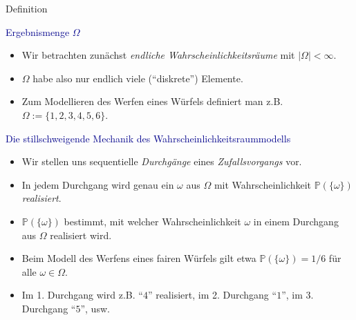 \documentclass[
  8pt,
  ignorenonframetext,
]{beamer}
\providecommand{\tightlist}{%
  \setlength{\itemsep}{0pt}\setlength{\parskip}{0pt}}
\begin{document}
\begin{frame}{Definition}
\protect\hypertarget{definition-3}{}

\textcolor{darkblue}{Ergebnismenge $\Omega$} \small

\begin{itemize}
\tightlist
\item
  Wir betrachten zunächst \emph{endliche Wahrscheinlichkeitsräume} mit
  \(|\Omega|<\infty\).
\item
  \(\Omega\) habe also nur endlich viele (``diskrete'') Elemente.
\item
  Zum Modellieren des Werfen eines Würfels definiert man z.B.
  \(\Omega := \{1,2,3,4,5,6\}\).
\end{itemize}

\vspace{5mm}
\normalsize

\textcolor{darkblue}{Die stillschweigende Mechanik des Wahrscheinlichkeitsraummodells}
\small

\begin{itemize}
\tightlist
\item
  Wir stellen uns sequentielle \emph{Durchgänge} eines
  \emph{Zufallsvorgangs} vor.
\item
  In jedem Durchgang wird genau ein \(\omega\) aus \(\Omega\) mit
  Wahrscheinlichkeit \(\mathbb{P}(\{\omega\})\) \emph{realisiert}.
\item
  \(\mathbb{P}(\{\omega\})\) bestimmt, mit welcher Wahrscheinlichkeit
  \(\omega\) in einem Durchgang aus \(\Omega\) realisiert wird.
\item
  Beim Modell des Werfens eines fairen Würfels gilt etwa
  \(\mathbb{P}(\{\omega\}) = 1/6\) für alle \(\omega \in \Omega\).
\item
  Im 1. Durchgang wird z.B. ``\(4\)'' realisiert, im 2. Durchgang
  ``\(1\)'', im 3. Durchgang ``\(5\)'', usw.
\end{itemize}
\end{frame}
\end{document}
